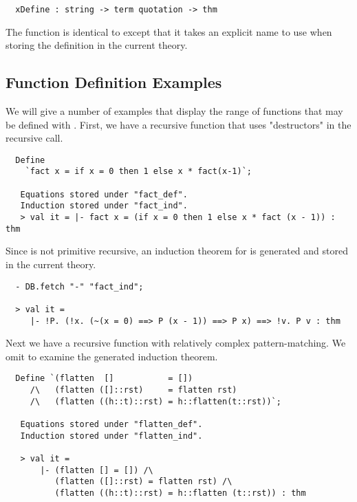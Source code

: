 \begin{hol}
\begin{verbatim}
  xDefine : string -> term quotation -> thm
\end{verbatim}
\end{hol}
The  function is identical to
 except that it takes an explicit name to use when
storing the definition in the current theory. 

\subsection{Function Definition Examples}
 We will give a number of examples that display the range of functions
that may be defined with . First, we have a recursive function
that uses "destructors" in the recursive call. 
 
\begin{hol}
\begin{verbatim}
  Define 
    `fact x = if x = 0 then 1 else x * fact(x-1)`;

   Equations stored under "fact_def".
   Induction stored under "fact_ind".
   > val it = |- fact x = (if x = 0 then 1 else x * fact (x - 1)) : thm
\end{verbatim}
\end{hol}
%
Since  is not
primitive recursive, an induction theorem for  is generated and 
stored in the current theory.
%
\begin{hol}
\begin{verbatim}
  - DB.fetch "-" "fact_ind";
 
  > val it =
     |- !P. (!x. (~(x = 0) ==> P (x - 1)) ==> P x) ==> !v. P v : thm
\end{verbatim}
\end{hol}
 
Next we have a recursive function with relatively complex
pattern-matching. We omit to examine the generated induction
theorem.
%
\begin{hol}
\begin{verbatim}
  Define `(flatten  []           = [])
     /\   (flatten ([]::rst)     = flatten rst)
     /\   (flatten ((h::t)::rst) = h::flatten(t::rst))`;

   Equations stored under "flatten_def".
   Induction stored under "flatten_ind".

   > val it =
       |- (flatten [] = []) /\
          (flatten ([]::rst) = flatten rst) /\
          (flatten ((h::t)::rst) = h::flatten (t::rst)) : thm
\end{verbatim}
\end{hol}
 
